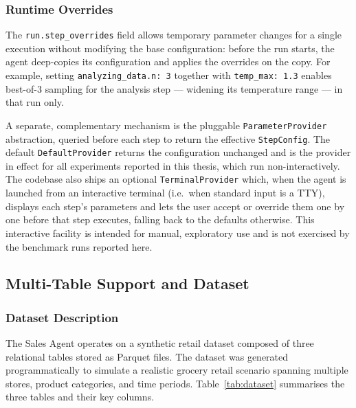 \subsubsection{Runtime Overrides}

The \texttt{run.step\_overrides} field allows temporary parameter changes for a
single execution without modifying the base configuration: before the run starts,
the agent deep-copies its configuration and applies the overrides on the copy. For
example, setting \texttt{analyzing\_data.n: 3} together with \texttt{temp\_max: 1.3}
enables best-of-$3$ sampling for the analysis step --- widening its temperature
range --- in that run only.

A separate, complementary mechanism is the pluggable \texttt{ParameterProvider}
abstraction, queried before each step to return the effective \texttt{StepConfig}.
The default \texttt{DefaultProvider} returns the configuration unchanged and is the
provider in effect for all experiments reported in this thesis, which run
non-interactively. The codebase also ships an optional \texttt{TerminalProvider}
which, when the agent is launched from an interactive terminal (i.e.\ when standard
input is a TTY), displays each step's parameters and lets the user accept or override
them one by one before that step executes, falling back to the defaults otherwise.
This interactive facility is intended for manual, exploratory use and is not exercised
by the benchmark runs reported here.

\subsection{Multi-Table Support and Dataset}
\label{subsec:multitable}

\subsubsection{Dataset Description}

The Sales Agent operates on a synthetic retail dataset composed of three relational
tables stored as Parquet files. The dataset was generated programmatically to
simulate a realistic grocery retail scenario spanning multiple stores, product
categories, and time periods. Table~\ref{tab:dataset} summarises the three tables
and their key columns.

